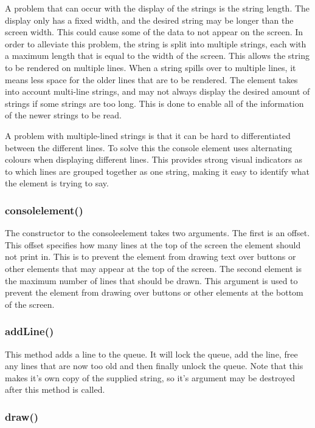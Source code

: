 A problem that can occur with the display of the strings is the string length. The display only has a fixed width, and the desired string may be longer than the screen width. This could cause some of the data to not appear on the screen. In order to alleviate this problem, the string is split into multiple strings, each with a maximum length that is equal to the width of the screen. This allows the string to be rendered on multiple lines. When a string spills over to multiple lines, it means less space for the older lines that are to be rendered. The element takes into account multi-line strings, and may not always display the desired amount of strings if some strings are too long. This is done to enable all of the information of the newer strings to be read.

A problem with multiple-lined strings is that it can be hard to differentiated between the different lines. To solve this the console element uses alternating colours when displaying different lines. This provides strong visual indicators as to which lines are grouped together as one string, making it easy to identify what the element is trying to say.

\subsubsection{consolelement()}

The constructor to the consoleelement takes two arguments. The first is an offset. This offset specifies how many lines at the top of the screen the element should not print in. This is to prevent the element from drawing text over buttons or other elements that may appear at the top of the screen. The second element is the maximum number of lines that should be drawn. This argument is used to prevent the element from drawing over buttons or other elements at the bottom of the screen.

\subsubsection{addLine()}

This method adds a line to the queue. It will lock the queue, add the line, free any lines that are now too old and then finally unlock the queue. Note that this makes it's own copy of the supplied string, so it's argument may be destroyed after this method is called.

\subsubsection{draw()}

